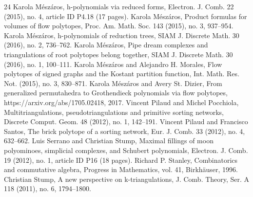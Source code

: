 \documentclass[10pt]{amsart}
\theoremstyle{definition}
\numberwithin{equation}{section}
\newcommand*\+{\smash{\lower2pt\hbox{\rlap{\vrule height14pt}}\raise2pt\hbox{\rlap{\hskip-3pt \vrule height.4pt depth0pt width14.7pt}}}}
\begin{document}
\begin{thebibliography}{24}
 Karola Mészáros, h-polynomials via reduced forms, Electron. J. Comb. 22 (2015), no. 4, article ID P4.18 (17 pages).
 Karola Mészáros, Product formulas for volumes of flow polytopes, Proc. Am. Math. Soc. 143 (2015), no. 3, 937–954.
 Karola Mészáros, h-polynomials of reduction trees, SIAM J. Discrete Math. 30 (2016), no. 2, 736–762.
 Karola Mészáros, Pipe dream complexes and triangulations of root polytopes belong together, SIAM J. Discrete Math. 30 (2016), no. 1, 100–111.
 Karola Mészáros and Alejandro H. Morales, Flow polytopes of signed graphs and the Kostant partition function, Int. Math. Res. Not. (2015), no. 3, 830–871.
 Karola Mészáros and Avery St. Dizier, From generalized permutahedra to Grothendieck polynomials via flow polytopes, https://arxiv.org/abs/1705.02418, 2017.
 Vincent Pilaud and Michel Pocchiola, Multitriangulations, pseudotriangulations and primitive sorting networks, Discrete Comput. Geom. 48 (2012), no. 1, 142–191.
 Vincent Pilaud and Francisco Santos, The brick polytope of a sorting network, Eur. J. Comb. 33 (2012), no. 4, 632–662.
 Luis Serrano and Christian Stump, Maximal fillings of moon polyominoes, simplicial complexes, and Schubert polynomials, Electron. J. Comb. 19 (2012), no. 1, article ID P16 (18 pages).
 Richard P. Stanley, Combinatorics and commutative algebra, Progress in Mathematics, vol. 41, Birkhäuser, 1996.
 Christian Stump, A new perspective on k-triangulations, J. Comb. Theory, Ser. A 118 (2011), no. 6, 1794–1800.
\end{thebibliography}
\end{document}
